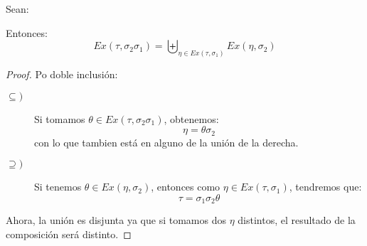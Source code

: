\begin{lema}
    Sean:
    \begin{figure}[H]
        \centering
    \end{figure}
    Entonces:
    \begin{equation*}
        Ex(\tau,\sigma_2\sigma_1) = \biguplus_{\eta \in Ex(\tau,\sigma_1)} Ex(\eta,\sigma_2)
    \end{equation*}
    \begin{proof}
        Po doble inclusión:
        \begin{description}
            \item [$\subseteq )$] Si tomamos $\theta \in Ex(\tau,\sigma_2\sigma_1)$, obtenemos:
                \begin{equation*}
                    \eta = \theta\sigma_2
                \end{equation*}
                con lo que tambien está en alguno de la unión de la derecha.
            \item [$\supseteq )$]  Si tenemos $\theta \in Ex(\eta,\sigma_2)$, entonces como $\eta \in Ex(\tau,\sigma_1)$, tendremos que:
                \begin{equation*}
                    \tau = \sigma_1\sigma_2\theta
                \end{equation*}
        \end{description}
        \begin{figure}[H] %
            \centering
        \end{figure}
        Ahora, la unión es disjunta ya que si tomamos dos $\eta$ distintos, el resultado de la composición será distinto.
    \end{proof}
\end{lema}

